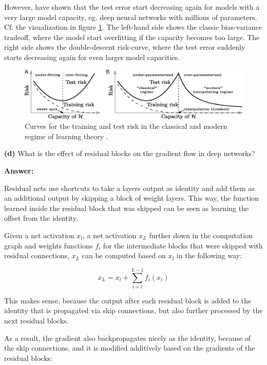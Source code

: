 However, \cite{belkin19} have shown that the test error start decreasing again for models with a very large model capacity, eg. deep neural networks with millions of parameters. Cf. the visualization in figure \ref{img:double-descent}. The left-hand side shows the classic bias-variance tradeoff, where the model start overfitting if the capacity becomes too large. The right side shows the double-descent risk-curve, where the test error suddenly starts decreasing again for even larger model capacities.

\begin{figure}
	\begin{center}
		\includegraphics[width=0.8\linewidth]{belkin19}
		\caption{Curves for the training and test risk in the classical and modern regime of learning theory \cite{belkin19}.}
		\label{img:double-descent}
	\end{center}
\end{figure}

\textbf{(d)} What is the effect of residual blocks on the gradient flow in deep networks?

\textbf{Answer:}

Residual nets use shortcuts to take a layers output as identity and add them as an additional output by skipping a block of weight layers. This way, the function learned inside the residual block that was skipped can be seen as learning the offset from the identity. 

Given a net activation $x_l$, a net activation $x_L$ further down in the computation graph and weights functions $f_i$ for the intermediate blocks that were skipped with residual connections, $x_L$ can be computed based on $x_l$ in the following way:

\begin{equation}
	x_L = x_l + \sum_{i=l}^{L-1} f_i(x_i) 
\end{equation}

This makes sense, because the output after each residual block is added to the identity that is propagated via skip connections, but also further processed by the next residual blocks. 

As a result, the gradient also backpropagates nicely as the identity, because of the skip connections, and it is modified additively based on the gradients of the residual blocks:

